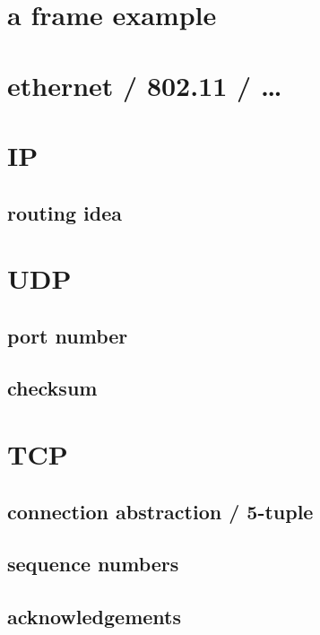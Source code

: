 \section{a frame example}



\section{ethernet / 802.11 / \ldots}



\section{IP}



\subsection{routing idea}



\section{UDP}

\subsection{port number}

\subsection{checksum}

\section{TCP}

\subsection{connection abstraction / 5-tuple}

\subsection{sequence numbers}

\subsection{acknowledgements}

